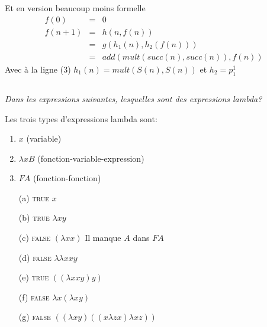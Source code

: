 Et en version beaucoup moins formelle
\begin{eqnarray}
	f(0) &=& 0 \\
	f(n+1) &=& h(n,f(n)) \\
	&=& g(h_1(n), h_2(f(n))) \\
	&=& add(mult(succ(n), succ(n)), f(n))
\end{eqnarray}
Avec à la ligne (3) $h_1(n) = mult(S(n), S(n))$ et $h_2 = p_1^1$

\subsection{}

\textit{Dans les expressions suivantes, lesquelles sont des expressions lambda?}

Les trois types d'expressions lambda sont:
\begin{enumerate}
	\item $x$ (variable)
	\item $\lambda x B$ (fonction-variable-expression)
	\item $F A$ (fonction-fonction)
\end{enumerate}

\begin{itemize}
	\item[(a)] \textsc{true} $x$
	\item[(b)] \textsc{true} $\lambda xy$
	\item[(c)] \textsc{false} $(\lambda xx)$ Il manque $A$ dans $F A$
	\item[(d)] \textsc{false} $\lambda \lambda xxy$
	\item[(e)] \textsc{true} $((\lambda xxy)y)$
	\item[(f)] \textsc{false} $\lambda x(\lambda xy)$
	\item[(g)] \textsc{false} $((\lambda xy)((x \lambda zx) \lambda xz))$
\end{itemize}

\subsection{}

